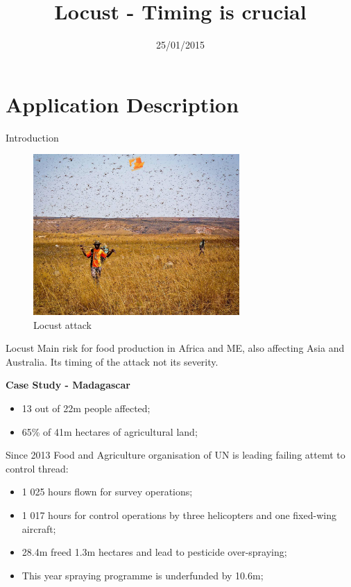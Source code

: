 \documentclass[9pt]{beamer}
\title[Appathon]{Locust - Timing is crucial}
\institute{Dadoes}
\date{25/01/2015}
\begin{document}
\begin{frame}
  \titlepage

\end{frame}


\section{Application Description}



\begin{frame}{Introduction}
	\begin{figure}
		\centering
		\includegraphics[width=0.7\textwidth]{pic/madagascar-locust-logo-DSCN9281-EN.jpg}
		\caption{Locust attack}
	\end{figure}
\end{frame}

	
\begin{frame}{Locust}
Main risk for food production in Africa and ME, also affecting Asia and Australia. Its timing of the attack not its severity.
\bigskip

\textbf{Case Study - Madagascar}

	\begin{itemize}
		\item 13 out of 22m people affected;
		\item 65\% of 41m hectares of agricultural land;
	 \end{itemize} 
	 Since 2013 Food and Agriculture organisation of UN is leading failing attemt to control thread:
	\begin{itemize}
		\item 1 025 hours flown for survey operations;
		\item 1 017 hours for control operations by three helicopters and one fixed-wing aircraft; 
		\item 28.4m freed 1.3m hectares and lead to pesticide over-spraying;
		\item This year spraying programme is underfunded by 10.6m; 
	 \end{itemize}
 
\end{frame}
\end{document}
